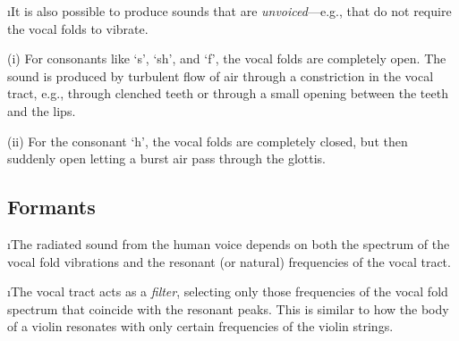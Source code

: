 \i It is also possible to produce sounds that are
{\em unvoiced}---e.g., that do not require the vocal
folds to vibrate.

(i) For consonants like `s', `sh', and `f', the vocal 
folds are completely open.
The sound is produced by turbulent flow of air through 
a constriction in the vocal tract, e.g., through clenched 
teeth or through a small opening between the teeth and 
the lips.

(ii) For the consonant `h', the vocal folds are 
completely closed, but then suddenly open letting a 
burst air pass through the glottis.

\ei
\subsection{Formants}
\bi

\i The radiated sound from the human voice depends
on both the spectrum of the vocal fold vibrations
and the resonant (or natural) frequencies of the vocal tract.

\i The vocal tract acts as a {\em filter},
selecting only those frequencies of the vocal fold
spectrum that coincide with the resonant peaks.
This is similar to how the body of a violin
resonates with only certain frequencies of the violin 
strings.

